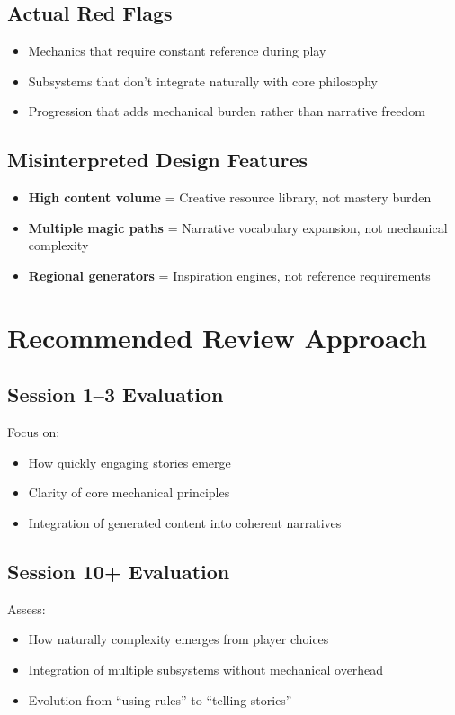 \documentclass[11pt]{article}
\begin{document}
\subsection{Actual Red Flags}
\begin{itemize}
    \item Mechanics that require constant reference during play
    \item Subsystems that don't integrate naturally with core philosophy
    \item Progression that adds mechanical burden rather than narrative freedom
\end{itemize}

\subsection{Misinterpreted Design Features}
\begin{itemize}
    \item \textbf{High content volume} = Creative resource library, not mastery burden
    \item \textbf{Multiple magic paths} = Narrative vocabulary expansion, not mechanical complexity
    \item \textbf{Regional generators} = Inspiration engines, not reference requirements
\end{itemize}

\section{Recommended Review Approach}

\subsection{Session 1–3 Evaluation}
Focus on:
\begin{itemize}
    \item How quickly engaging stories emerge
    \item Clarity of core mechanical principles
    \item Integration of generated content into coherent narratives
\end{itemize}

\subsection{Session 10+ Evaluation}
Assess:
\begin{itemize}
    \item How naturally complexity emerges from player choices
    \item Integration of multiple subsystems without mechanical overhead
    \item Evolution from ``using rules'' to ``telling stories''
\end{itemize}
\end{document}
